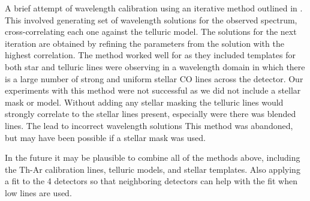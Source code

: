 A brief attempt of wavelength calibration using an iterative method outlined in \cite{brogi_rotation_2016}. This involved generating set of wavelength solutions for the observed spectrum, cross-correlating each one against the telluric model. The solutions for the next iteration are obtained by refining the parameters from the solution with the highest correlation. 
The method worked well for \citet{brogi_rotation_2016} as they included templates for both star and telluric lines were observing in a wavelength domain in which there is a large number of strong and uniform stellar CO lines across the detector. 
Our experiments with this method were not successful as we did not include a stellar mask or model. Without adding any stellar masking the telluric lines would strongly correlate to the stellar lines present, especially were there was blended lines. The lead to incorrect wavelength solutions This method was abandoned, but may have been possible if a stellar mask was used.




In the future it may be plausible to combine all of the methods above, including the Th-Ar calibration lines, telluric models, and stellar templates. Also applying a fit to the 4 detectors so that neighboring detectors can help with the fit when low lines are used.

